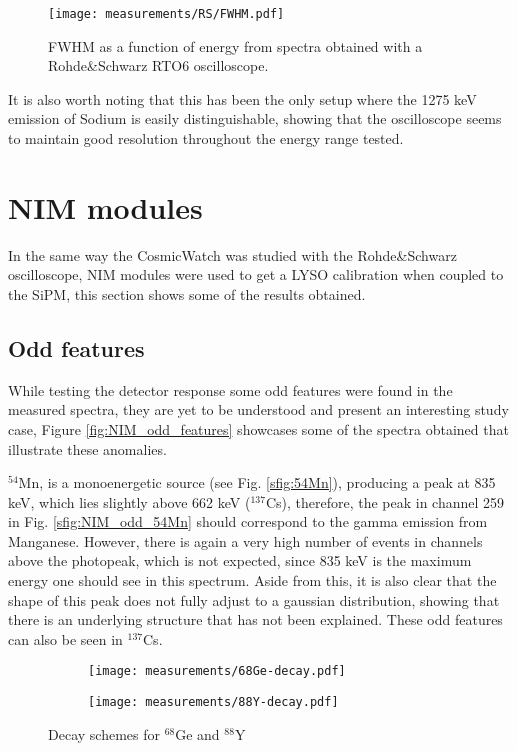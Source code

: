 \begin{figure}[H]
  \centering
  \texttt{[image: measurements/RS/FWHM.pdf]}
  \caption{\label{fig:RS_FWHM}FWHM as a function of energy from spectra obtained with a Rohde\&Schwarz RTO6 oscilloscope.}
\end{figure}

It is also worth noting that this has been the only setup where the 1275 keV emission of Sodium is easily distinguishable, showing that the oscilloscope seems to maintain good resolution throughout the energy range tested.

\newpage
\section{NIM modules}\label{sec:NIM_modules}

In the same way the CosmicWatch was studied with the Rohde\&Schwarz oscilloscope, NIM modules were used to get a LYSO calibration when coupled to the SiPM, this section shows some of the results obtained.

\subsection{Odd features}\label{sec:odd_features}

While testing the detector response some odd features were found in the measured spectra, they are yet to be understood and present an interesting study case, Figure \ref{fig:NIM_odd_features} showcases some of the spectra obtained that illustrate these anomalies.

$^{54}$Mn, is a monoenergetic source (see Fig. \ref{sfig:54Mn}), producing a peak at 835 \unit{\kilo\eV}, which lies slightly above 662 \unit{\kilo\eV} ($^{137}$Cs), therefore, the peak in channel 259 in Fig. \ref{sfig:NIM_odd_54Mn} should correspond to the gamma emission from Manganese. However, there is again a very high number of events in channels above the photopeak, which is not expected, since 835 \unit{\kilo\eV} is the maximum energy one should see in this spectrum. Aside from this, it is also clear that the shape of this peak does not fully adjust to a gaussian distribution, showing that there is an underlying structure that has not been explained. These odd features can also be seen in $^{137}$Cs.

\begin{figure}[H]
  \centering
  \begin{subfigure}[t]{0.53\textwidth}
    \texttt{[image: measurements/68Ge-decay.pdf]}
    \caption{\label{sfig:68Ge_decay_scheme}}
  \end{subfigure}
  \begin{subfigure}[t]{0.425\textwidth}
    \texttt{[image: measurements/88Y-decay.pdf]}
    \caption{\label{sfig:88Y_decay_scheme}}
  \end{subfigure}
  \caption{\label{fig:some_decay_schemes}Decay schemes for $^{68}$Ge and $^{88}$Y}
\end{figure}

